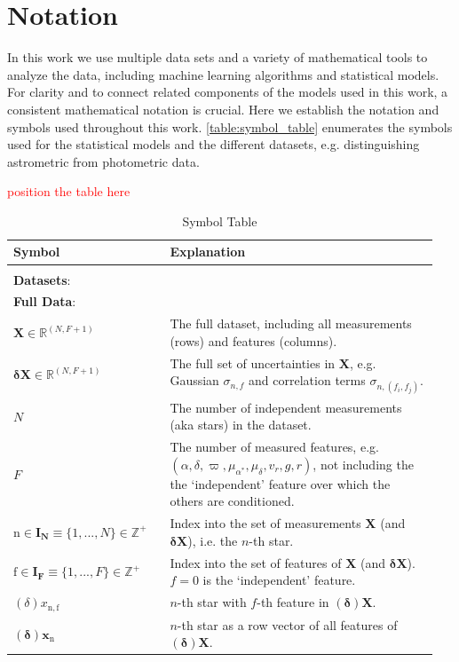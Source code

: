 \documentclass[twocolumn]{aastex631}
\newcommand{\mrm}[1]{\mathrm{#1}}
\newcommand{\mbs}[1]{\boldsymbol{#1}}
\newcommand{\mbf}[1]{\mathbf{#1}}
\newcommand{\mbb}[1]{\mathbb{#1}}
\newcommand{\nth}[1]{{#1}_{\mrm{n}}}  %
\newcommand{\parallax}{\varpi}
\newcommand{\TODO}[1]{{\textcolor{red}{#1}}}
\begin{document}
{\appendix

\section{Notation} \label{app:notation}

    In this work we use multiple data sets and a variety of mathematical tools
    to analyze the data, including machine learning algorithms and statistical
    models.  For clarity and to connect related components of the models used in
    this work, a consistent mathematical notation is crucial. Here we establish
    the notation and symbols used throughout this work.
    \autoref{table:symbol_table} enumerates the symbols used for the statistical
    models and the different datasets, e.g. distinguishing astrometric from
    photometric data. 

    \TODO{position the table here}

    \begin{table}
    \centering
    \caption{Symbol Table}
    \label{table:symbol_table}
    \begin{tabular}{p{0.35\linewidth} p{0.6\linewidth}}
    Symbol                         & Explanation \\
    \toprule
    \\
    \multicolumn{2}{l}{\textbf{Datasets}:} \\
    \midrule
    \multicolumn{2}{l}{\textbf{Full Data}:}  \vspace{5pt} \\
    $\mbf{X} \in \mbb{R}^{(N, F+1)}$ & The full dataset, including all measurements (rows) and features (columns).  \\
    $\mbs{\delta}\mbf{X} \in \mbb{R}^{(N, F+1)}$ & The full set of uncertainties in $\mbf{X}$, e.g. Gaussian $\sigma_{n,f}$ and correlation terms $\sigma_{n,(f_i, f_j)}$.\\
    $N$ & The number of independent measurements (aka stars) in the dataset.  \\
    $F$ & The number of measured features, e.g. $(\alpha, \delta, \parallax, \mu_{\alpha^*}, \mu_\delta, v_r, g, r)$,  not including the the `independent' feature over which the others are conditioned. \\
    $\mrm{n} \in \mbs{I_N} \equiv \{1, ..., N\} \in \mbb{Z^+}$ & Index into the set of measurements $\mbf{X}$ (and $\mbs{\delta}\mbf{X}$), i.e. the $n$-th star. \\
    $\mrm{f} \in \mbs{I_F}  \equiv \{1, ..., F\} \in \mbb{Z^+}$ & Index into the set of features of $\mbf{X}$  (and $\mbs{\delta}\mbf{X}$). $ f=0$ is the `independent' feature.\\
    $(\delta)x_{\mrm{n,f}}$ & $n$-th star with $f$-th feature in $(\mbs{\delta})\mbf{X}$. \\
    $(\mbs{\delta})\nth{\mbs{x}}$ & $n$-th star as a row vector of all features of $(\mbs{\delta})\mbf{X}$. \\
    

\end{tabular}
\end{table}}
\end{document}
